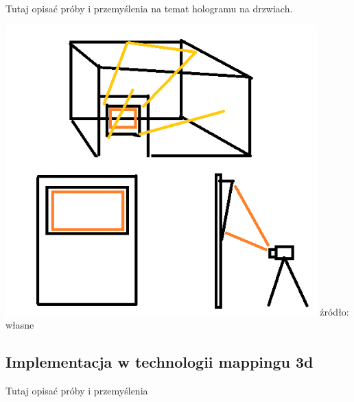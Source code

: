 \paragraph{}
{\color{red}Tutaj opisać próby i przemyślenia na temat hologramu na drzwiach.}
\begin{center}
\includegraphics[width=0.9\textwidth]{images/hologramv1.png}
\small {źródło: własne }
\end{center}

\subsection{Implementacja w technologii mappingu 3d}
{\color{red}Tutaj opisać próby i przemyślenia}